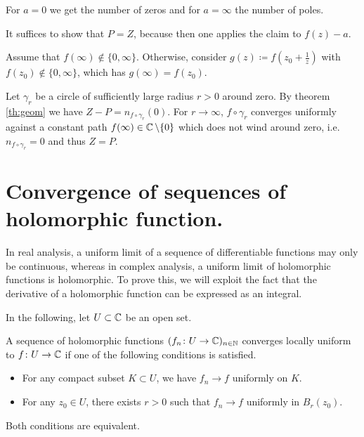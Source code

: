 \documentclass[a4paper,english]{article}
\begin{document}
For $a = 0$ we get the number of zeros and for $a = \infty$ the number of poles.

\begin{pr}
    It suffices to show that $P = Z$, because then one applies the claim to $f(z) - a$.
    
    Assume that $f(\infty) \not\in \{ 0, \infty \}$.
    Otherwise, consider $g(z) \coloneqq f\left(z_0 + \frac{1}{z}\right)$ with $f(z_0) \not\in \{ 0, \infty \}$, which has $g(\infty) = f(z_0)$.
    
    Let $\gamma_r$ be a circle of sufficiently large radius $r > 0$ around zero.
    By theorem \ref{th:geom} we have $Z - P = n_{f \circ \gamma_r}(0)$.
    For $r \to \infty$, $f \circ \gamma_r$ converges uniformly against a constant path $f(\infty) \in \operatorname{\mathbb{C}} \setminus \{ 0 \}$ which does not wind around zero, i.e. $n_{f \circ \gamma_r} = 0$ and thus $Z = P$.
\end{pr}


\section{Convergence of sequences of holomorphic function.}

In real analysis, a uniform limit of a sequence of differentiable functions may only be continuous, whereas in complex analysis, a uniform limit of holomorphic functions is holomorphic.
To prove this, we will exploit the fact that the derivative of a holomorphic function can be expressed as an integral.


In the following, let $U \subset \operatorname{\mathbb{C}}$ be an open set.

\begin{defn}
    A sequence of holomorphic functions $(f_n \colon U \to \operatorname{\mathbb{C}})_{n \in \operatorname{\mathbb{N}}}$ converges locally uniform to $f \colon U \to \operatorname{\mathbb{C}}$ if one of the following conditions is satisfied.
    \begin{itemize}
        \item 
        For any compact subset $K \subset U$, we have $f_n \to f$ uniformly on $K$.
        
        \item
        For any $z_0 \in U$, there exists $r > 0$ such that $f_n \to f$ uniformly in $B_r(z_0)$.
    \end{itemize}
\end{defn}

\begin{lemma}
    Both conditions are equivalent.
\end{lemma}
\end{document}
